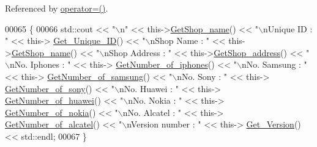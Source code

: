 Referenced by \hyperlink{_c_a_r_l_o_w___w_8h_source_l00075}{operator=()}.


\begin{DoxyCode}
00065 \{
00066    std::cout << \textcolor{stringliteral}{"\(\backslash\)n"} <<  this->\hyperlink{class_c_a_r_l_o_w___w_a68235a63964645c525620053a33de863_a68235a63964645c525620053a33de863}{GetShop\_name}() << \textcolor{stringliteral}{"\(\backslash\)nUnique ID : "} << this->
      \hyperlink{class_o_s_t_m_a5a01a8b98d16b1d1904ecf9356e7b71d_a5a01a8b98d16b1d1904ecf9356e7b71d}{Get\_Unique\_ID}() << \textcolor{stringliteral}{"\(\backslash\)nShop Name : "}  << this->\hyperlink{class_c_a_r_l_o_w___w_a68235a63964645c525620053a33de863_a68235a63964645c525620053a33de863}{GetShop\_name}() << \textcolor{stringliteral}{"\(\backslash\)nShop Address : 
      "} << this->\hyperlink{class_c_a_r_l_o_w___w_af48a2f69706be684115758820ce79ddd_af48a2f69706be684115758820ce79ddd}{GetShop\_address}() << \textcolor{stringliteral}{"\(\backslash\)nNo. Iphones : "} << this->
      \hyperlink{class_c_a_r_l_o_w___w_a50395c707116ea1176743ed98c6b1f76_a50395c707116ea1176743ed98c6b1f76}{GetNumber\_of\_iphones}() << \textcolor{stringliteral}{"\(\backslash\)nNo. Samsung : "} << this->
      \hyperlink{class_c_a_r_l_o_w___w_aecc697b6d017d88f2bdbe3cea2bf3496_aecc697b6d017d88f2bdbe3cea2bf3496}{GetNumber\_of\_samsung}() << \textcolor{stringliteral}{"\(\backslash\)nNo. Sony : "} << this->
      \hyperlink{class_c_a_r_l_o_w___w_a6d31219dac9b4d8842e14b7414ed286e_a6d31219dac9b4d8842e14b7414ed286e}{GetNumber\_of\_sony}() << \textcolor{stringliteral}{"\(\backslash\)nNo. Huawei : "} << this->
      \hyperlink{class_c_a_r_l_o_w___w_aea38b51a44cda35a01beb7d45fa7a2a4_aea38b51a44cda35a01beb7d45fa7a2a4}{GetNumber\_of\_huawei}() << \textcolor{stringliteral}{"\(\backslash\)nNo. Nokia : "} << this->
      \hyperlink{class_c_a_r_l_o_w___w_a4e3a644ee69bc4bc4ab3feac1493192b_a4e3a644ee69bc4bc4ab3feac1493192b}{GetNumber\_of\_nokia}() << \textcolor{stringliteral}{"\(\backslash\)nNo. Alcatel : "} << this->
      \hyperlink{class_c_a_r_l_o_w___w_ae7ab8852e5eeff1c2cd397126fbac0e7_ae7ab8852e5eeff1c2cd397126fbac0e7}{GetNumber\_of\_alcatel}() << \textcolor{stringliteral}{"\(\backslash\)nVersion number : "} << this->
      \hyperlink{class_o_s_t_m_a1f1db9d482f22c8e7caa17dfb340626b_a1f1db9d482f22c8e7caa17dfb340626b}{Get\_Version}() << std::endl;
00067 \}
\end{DoxyCode}


